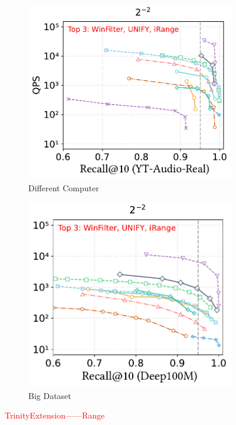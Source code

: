 \documentclass[sigconf, nonacm]{acmart}
\begin{document}
\begin{figure}[t]
	\begin{subfigure}[t]{0.507\columnwidth}
		\centering
		\includegraphics[width=\linewidth]{figures/exp/range_85.pdf}
		\captionsetup{font=small}
		\caption{Different Computer}
		\label{fig:Different_Computer_range}
	\end{subfigure}
	\hfill
	\begin{subfigure}[t]{0.48\columnwidth}
		\centering
		\includegraphics[width=\linewidth]{figures/exp/range_deep100M.pdf}
		\captionsetup{font=small}
		\caption{Big Dataset}
		\label{fig:Big_Dataset_range}
	\end{subfigure}
	
	
	\caption{\textcolor{red}{TrinityExtension——Range}}
	\label{fig:TrinityExtension——Range}
\end{figure}
	
\end{document}
